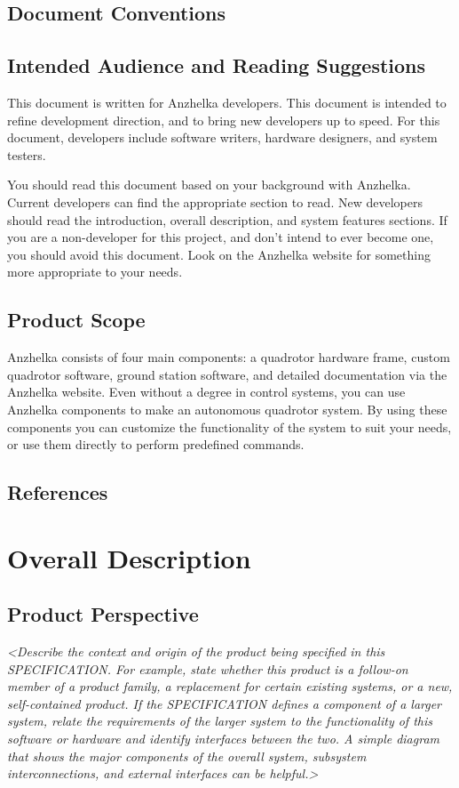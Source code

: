 \documentclass[english]{article}
\numberwithin{equation}{section} %
\begin{document}
\subsection{Document Conventions}
\subsection{Intended Audience and Reading Suggestions}
This document is written for Anzhelka developers. This document is intended to refine development direction, and to bring new developers up to speed. For this document, developers include software writers, hardware designers, and system testers.

You should read this document based on your background with Anzhelka. Current developers can find the appropriate section to read. New developers should read the introduction, overall description, and system features sections. If you are a non-developer for this project, and don't intend to ever become one, you should avoid this document. Look on the Anzhelka website for something more appropriate to your needs.


\subsection{Product Scope}
Anzhelka consists of four main components: a quadrotor hardware frame, custom quadrotor software, ground station software, and detailed documentation via the Anzhelka website. Even without a degree in control systems, you can use Anzhelka components to make an autonomous quadrotor system. By using these components you can customize the functionality of the system to suit your needs, or use them directly to perform predefined commands.


\subsection{References}

\newpage
\section{Overall Description}
\subsection{Product Perspective}
\textit{<Describe the context and origin of the product being specified in this SPECIFICATION. For example, state whether this product is a follow-on member of a product family, a replacement for certain existing systems, or a new, self-contained product. If the SPECIFICATION defines a component of a larger system, relate the requirements of the larger system to the functionality of this software or hardware and identify interfaces between the two. A simple diagram that shows the major components of the overall system, subsystem interconnections, and external interfaces can be helpful.>}
\end{document}
